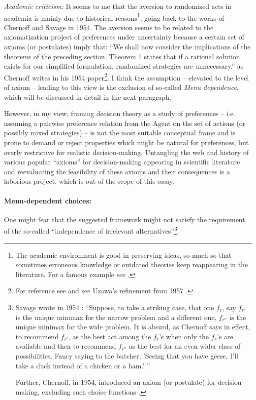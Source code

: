 \documentclass{article}
\begin{document}
{\it Academic criticism:}
It seems to me that the aversion to randomized acts in academia is mainly due to historical reasons\footnote{The academic environment is good in preserving ideas, so much so that sometimes erroneous knowledge or outdated theories keep reappearing in the literature. For a famous example see \cite{blog:ElectronCharge,speach:FeynmanCargoCultScience}.}, going back to the works of Chernoff and Savage in 1954.
The aversion seems to be related to the axiomatization project of preferences under uncertainty because a certain set of axioms (or postulates) imply that: ``We shall now consider the implications of the theorems of the preceding section. Theorem 1 states that if a rational solution exists for our simplified formulation, randomized strategies are unnecessary.'' as Chernoff writes in his 1954 paper\footnote{For reference see \cite{paper:Chernoff1954} and see Uzawa's refinement from 1957 \cite{paper:Uzawa1957}.}. 
I think the assumption -- elevated to the level of axiom -- leading to this view is the exclusion of so-called \emph{Menu dependence}, which will be discussed in detail in the next paragraph. 

However, in my view, framing decision theory as a study of preferences -- i.e. assuming a pairwise preference relation from the Agent on the set of actions (or possibly mixed strategies) -- is not the most suitable conceptual frame and is prone to demand or reject properties which might be natural for preferences, but overly restrictive for realistic decision-making.
Untangling the web and history of various popular ``axioms'' for decision-making appearing in scientific literature and reevaluating the feasibility of these axioms and their consequences is a laborious project, which is out of the scope of this essay.

\paragraph{Menu-dependent choices:}
One might fear that the suggested framework might not satisfy the requirement of the so-called ``independence of irrelevant alternatives''\footnote{Savage wrote in 1954 \cite{book:Savage}:
``Suppose, to take a striking case, that one $f_r$, say $f_{r'}$ is the unique minimax for the narrow problem and a different one, $f_{r''}$ is the unique minimax for the wide problem. It is absurd, as Chernoff says in effect, to recommend $f_{r'}$, as the best act among the $f_r$'s when only the $f_r$'s are available and then to recommend $f_{r''}$ as the best for an even wider class of possibilities. Fancy saying to the butcher, 'Seeing that you have geese, I'll take a duck instead of a chicken or a ham.' ''. 

Further, Chernoff, in 1954, introduced an axiom (or postulate) for decision-making, excluding such choice functions \cite{paper:Chernoff1954}.}.
\end{document}
